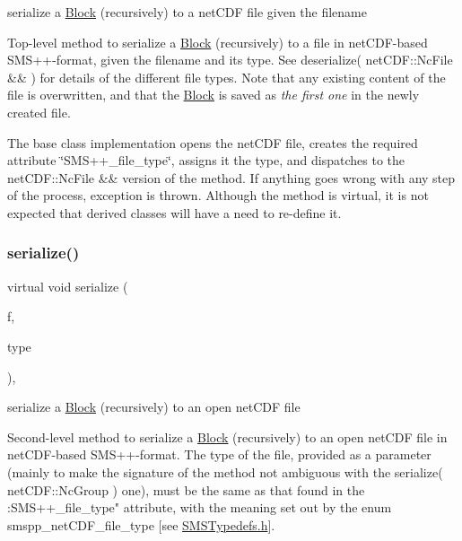 serialize a \mbox{\hyperlink{class_s_m_spp__di__unipi__it_1_1_block}{Block}} (recursively) to a net\+C\+DF file given the filename 

Top-\/level method to serialize a \mbox{\hyperlink{class_s_m_spp__di__unipi__it_1_1_block}{Block}} (recursively) to a file in net\+C\+D\+F-\/based S\+M\+S++-\/format, given the filename and its type. See deserialize( net\+C\+D\+F\+::\+Nc\+File \&\& ) for details of the different file types. Note that any existing content of the file is overwritten, and that the \mbox{\hyperlink{class_s_m_spp__di__unipi__it_1_1_block}{Block}} is saved as {\itshape the first one} in the newly created file.

The base class implementation opens the net\+C\+DF file, creates the required attribute \char`\"{}\+S\+M\+S++\+\_\+file\+\_\+type\char`\"{}, assigns it the type, and dispatches to the net\+C\+D\+F\+::\+Nc\+File \&\& version of the method. If anything goes wrong with any step of the process, exception is thrown. Although the method is virtual, it is not expected that derived classes will have a need to re-\/define it. \mbox{\label{class_s_m_spp__di__unipi__it_1_1_block_a7f0d5cf07b22aef912bfa8ac4b45924c}} 
\subsubsection{\texorpdfstring{serialize()}{serialize()}\hspace{0.1cm}{\footnotesize\ttfamily [2/3]}}
{\footnotesize\ttfamily virtual void serialize (\begin{DoxyParamCaption}\item[{net\+C\+D\+F\+::\+Nc\+File \&\&}]{f,  }\item[{const int}]{type }\end{DoxyParamCaption})\hspace{0.3cm}{\ttfamily [inline]}, {\ttfamily [virtual]}}



serialize a \mbox{\hyperlink{class_s_m_spp__di__unipi__it_1_1_block}{Block}} (recursively) to an open net\+C\+DF file 

Second-\/level method to serialize a \mbox{\hyperlink{class_s_m_spp__di__unipi__it_1_1_block}{Block}} (recursively) to an open net\+C\+DF file in net\+C\+D\+F-\/based S\+M\+S++-\/format. The type of the file, provided as a parameter (mainly to make the signature of the method not ambiguous with the serialize( net\+C\+D\+F\+::\+Nc\+Group ) one), must be the same as that found in the \+:S\+M\+S++\+\_\+file\+\_\+type" attribute, with the meaning set out by the enum smspp\+\_\+net\+C\+D\+F\+\_\+file\+\_\+type \mbox{[}see \mbox{\hyperlink{_s_m_s_typedefs_8h}{S\+M\+S\+Typedefs.\+h}}\mbox{]}.

